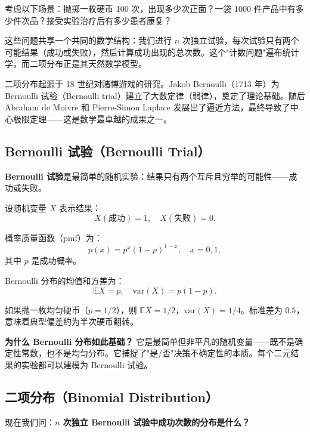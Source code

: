 考虑以下场景：抛掷一枚硬币 100 次，出现多少次正面？一袋 1000 件产品中有多少件次品？接受实验治疗后有多少患者康复？

这些问题共享一个共同的数学结构：我们进行 $n$ 次独立试验，每次试验只有两个可能结果（成功或失败），然后计算成功出现的总次数。这个"计数问题"遍布统计学，而二项分布正是其天然数学模型。

二项分布起源于 18 世纪对赌博游戏的研究。Jakob Bernoulli（1713 年）为 Bernoulli 试验（Bernoulli trial）建立了大数定律（弱律），奠定了理论基础。随后 Abraham de Moivre 和 Pierre-Simon Laplace 发展出了逼近方法，最终导致了中心极限定理——这是数学最卓越的成果之一。

\subsection{Bernoulli 试验（Bernoulli Trial）}\label{sub:bernoulli-trials-ch3}

\textbf{Bernoulli 试验}是最简单的随机实验：结果只有两个互斥且穷举的可能性——成功或失败。

设随机变量 $X$ 表示结果：
\[
X(\text{成功}) = 1, \quad X(\text{失败}) = 0.
\]

概率质量函数（pmf）为：
\begin{equation}\label{eq:bernoulli-pmf-ch3}
p(x) = p^{x}(1-p)^{1-x}, \quad x = 0, 1,
\end{equation}
其中 $p$ 是成功概率。

Bernoulli 分布的均值和方差为：
\begin{equation}\label{eq:bernoulli-moments-ch3}
\mathbb{E}X = p, \quad \text{var}(X) = p(1-p).
\end{equation}

\begin{example}[抛硬币]\label{ex:coin-toss-ch3}
如果抛一枚均匀硬币（$p = 1/2$），则 $\mathbb{E}X = 1/2$，$\text{var}(X) = 1/4$。标准差为 $0.5$，意味着典型偏差约为半次硬币翻转。
\end{example}

\textbf{为什么 Bernoulli 分布如此基础？} 它是最简单但非平凡的随机变量——既不是确定性常数，也不是均匀分布。它捕捉了"是/否"决策不确定性的本质。每个二元结果的实验都可以建模为 Bernoulli 试验。

\subsection{二项分布（Binomial Distribution）}\label{sub:binomial-distribution-ch3}

现在我们问：\textbf{$n$ 次独立 Bernoulli 试验中成功次数的分布是什么？}


